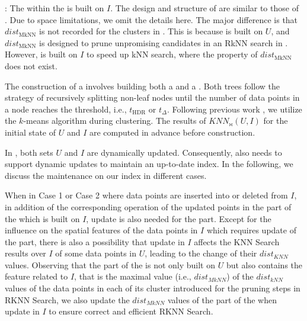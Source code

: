 \sstitle{\deltatree}:
The \deltatree within the \dualtree is built on $I$. The design and structure of \deltatree are similar to those of \hdrtree. Due to space limitations, we omit the details here.
%
The major difference is that $dist_\text{MkNN}$ is not recorded for the clusters in \deltatree.
%
This is because \hdrtree is built on $U$, and $dist_\text{MkNN}$ is designed to prune unpromising candidates in an RkNN search in \fdknnj. However, \deltatree is built on $I$ to speed up kNN search, where the property of $dist_\text{MkNN}$ does not exist.


%
The construction of a \dualtree involves building both a \hdrtree and a \deltatree. Both trees follow the strategy of recursively splitting non-leaf nodes until the number of data points in a node reaches the threshold, i.e., $t_\text{HDR}$ or $t_\Delta$.
%
Following previous work \cite{cui2003contorting, yang2014continuous, ukey2022efficient, ukey2023efficient}, we utilize the $k$-means algorithm \cite{macqueen1967some,singh2013k} during clustering. The results of $KNN_{\bowtie}(U,I)$ for the initial state of $U$ and $I$ are computed in advance before construction.
%

%
In \fdknnj, both sets $U$ and $I$ are dynamically updated. Consequently, \dualtree also needs to support dynamic updates to maintain an up-to-date index. In the following, we discuss the maintenance on our \dualtree index in different cases.


When in Case 1 or Case 2 where data points are inserted into or deleted from $I$, in addition of the corresponding operation of the updated points in the \deltatree part of the \dualtree which is built on $I$, update is also needed for the \hdrtree part. Except for the influence on the spatial features of the data points in $I$ which requires update of the \deltatree part, there is also a possibility that update in $I$ affects the KNN Search results over $I$ of some data points in $U$, leading to the change of their $dist_{KNN}$ values. Observing that the \hdrtree part of the \dualtree is not only built on $U$ but also contains the feature related to $I$, that is the maximal value (i.e., $dist_{MkNN}$) of the $dist_{kNN}$ values of the data points in each of its cluster introduced for the pruning steps in RKNN Search, we also update the $dist_{MkNN}$ values of the \hdrtree part of the \dualtree when update in $I$ to ensure correct and efficient RKNN Search.

